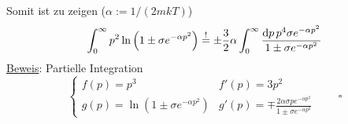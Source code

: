 Somit ist zu zeigen ($\alpha := 1/(2 m k T)$)
\begin{equation}
    \begin{split}
        \int_0^\infty p^2 \ln \left( 1 \pm \sigma e^{-\alpha p^2} \right) \overset{!}{=} \pm \frac{3}{2} \alpha \int_0^\infty \frac{\mathrm{d} p \, p^4 \sigma e^{-\alpha p^2}}{1 \pm \sigma e^{-\alpha p^2}}
    \end{split}
\end{equation}
\underline{Beweis}: Partielle Integration
\begin{equation}
    \begin{cases}
        f(p) = p^3 & f'(p) = 3p^2 \\
        g(p) = \ln \left( 1 \pm \sigma e^{-\alpha p^2} \right) & g'(p) = \mp \frac{2 \alpha \sigma p e^{-\alpha p^2}}{1 \pm \sigma e^{- \alpha p^2}}
    \end{cases}
    \qquad \square
\end{equation}
